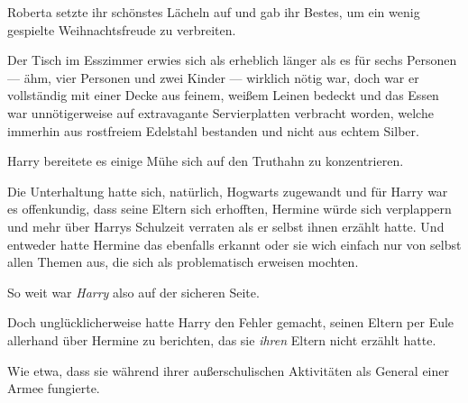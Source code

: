 Roberta setzte ihr schönstes Lächeln auf und gab ihr Bestes, um ein wenig gespielte Weihnachtsfreude zu verbreiten.

\later

Der Tisch im Esszimmer erwies sich als erheblich länger als es für sechs Personen — ähm, vier Personen und zwei Kinder — wirklich nötig war, doch war er vollständig mit einer Decke aus feinem, weißem Leinen bedeckt und das Essen war unnötigerweise auf extravagante Servierplatten verbracht worden, welche immerhin aus rostfreiem Edelstahl bestanden und nicht aus echtem Silber.

Harry bereitete es einige Mühe sich auf den Truthahn zu konzentrieren.

Die Unterhaltung hatte sich, natürlich, Hogwarts zugewandt und für Harry war es offenkundig, dass seine Eltern sich erhofften, Hermine würde sich verplappern und mehr über Harrys Schulzeit verraten als er selbst ihnen erzählt hatte. Und entweder hatte Hermine das ebenfalls erkannt oder sie wich einfach nur von selbst allen Themen aus, die sich als problematisch erweisen mochten.

So weit war \emph{Harry} also auf der sicheren Seite.

Doch unglücklicherweise hatte Harry den Fehler gemacht, seinen Eltern per Eule allerhand über Hermine zu berichten, das sie \emph{ihren} Eltern nicht erzählt hatte.

Wie etwa, dass sie während ihrer außerschulischen Aktivitäten als General einer Armee fungierte.


